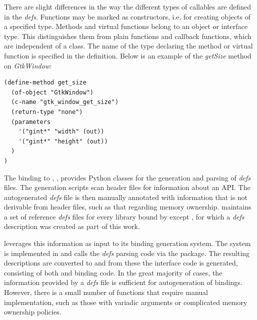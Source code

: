 \documentclass[article]{jss}
\begin{document}
There are slight differences in the way the different types of callables are defined in the \emph{defs}. Functions may be marked as constructors, i.e. for creating objects of a specified type. Methods and virtual functions belong to an object or interface type. This distinguishes them from plain functions and callback functions, which are independent of a class. The name of the type declaring the method or virtual function is specified in the definition.
Below is an
example of the \emph{getSize} method on \emph{GtkWindow}:
\begin{verbatim}
(define-method get_size
  (of-object "GtkWindow")
  (c-name "gtk_window_get_size")
  (return-type "none")
  (parameters
    '("gint*" "width" (out))
    '("gint*" "height" (out))
  )
)
\end{verbatim}


The  binding to ,
 \citep{PyGTK}, provides Python classes for the generation
and 
parsing of \emph{defs} files. The generation scripts scan 
header 
files for information about an API. The autogenerated \emph{defs} file
is then 
manually annotated with information that is not derivable from header
files, such as that
regarding memory ownership.  maintains a set of reference
\emph{defs} files
for every library bound by  except , for which a
\emph{defs}
description was created as part of this work.

 leverages this information as input to its binding
generation system.  The system is implemented in  and
calls the  \emph{defs} parsing code via the 
\citep{RSPython} package.  The resulting descriptions are converted to
 and from these the interface code is generated,
consisting of both  and  binding code. In the
great majority of cases, the information provided by a \emph{defs}
file is sufficient for autogeneration of bindings.  However, there is
a small number of functions that require manual implementation, such
as those with variadic arguments or complicated memory ownership
policies.
\end{document}
